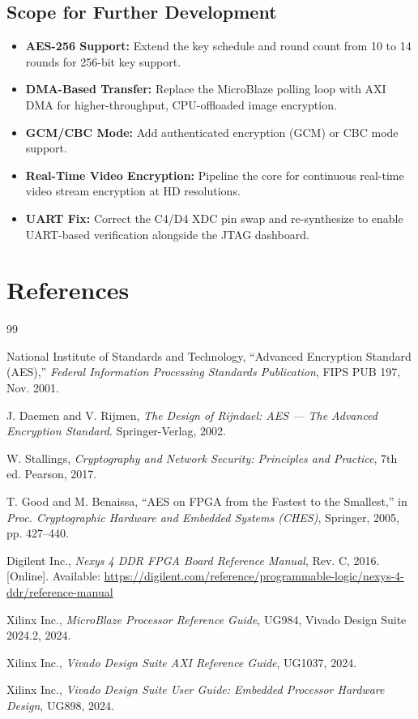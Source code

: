 \documentclass[12pt,a4paper]{article}
\begin{document}
\subsection{Scope for Further Development}

\begin{itemize}[leftmargin=*]
    \item \textbf{AES-256 Support:} Extend the key schedule and round count from 10 to 14 rounds for 256-bit key support.
    \item \textbf{DMA-Based Transfer:} Replace the MicroBlaze polling loop with AXI DMA for higher-throughput, CPU-offloaded image encryption.
    \item \textbf{GCM/CBC Mode:} Add authenticated encryption (GCM) or CBC mode support.
    \item \textbf{Real-Time Video Encryption:} Pipeline the core for continuous real-time video stream encryption at HD resolutions.
    \item \textbf{UART Fix:} Correct the C4/D4 XDC pin swap and re-synthesize to enable UART-based verification alongside the JTAG dashboard.
\end{itemize}

\section{References}

\begin{thebibliography}{99}

National Institute of Standards and Technology,
``Advanced Encryption Standard (AES),''
\textit{Federal Information Processing Standards Publication}, FIPS PUB 197, Nov. 2001.

J. Daemen and V. Rijmen,
\textit{The Design of Rijndael: AES --- The Advanced Encryption Standard}.
Springer-Verlag, 2002.

W. Stallings,
\textit{Cryptography and Network Security: Principles and Practice}, 7th ed.
Pearson, 2017.

T. Good and M. Benaissa,
``AES on FPGA from the Fastest to the Smallest,''
in \textit{Proc. Cryptographic Hardware and Embedded Systems (CHES)},
Springer, 2005, pp. 427--440.

Digilent Inc.,
\textit{Nexys 4 DDR FPGA Board Reference Manual}, Rev. C, 2016. [Online].
Available: \url{https://digilent.com/reference/programmable-logic/nexys-4-ddr/reference-manual}

Xilinx Inc.,
\textit{MicroBlaze Processor Reference Guide}, UG984, Vivado Design Suite 2024.2, 2024.

Xilinx Inc.,
\textit{Vivado Design Suite AXI Reference Guide}, UG1037, 2024.

Xilinx Inc.,
\textit{Vivado Design Suite User Guide: Embedded Processor Hardware Design}, UG898, 2024.

\end{thebibliography}
\end{document}
